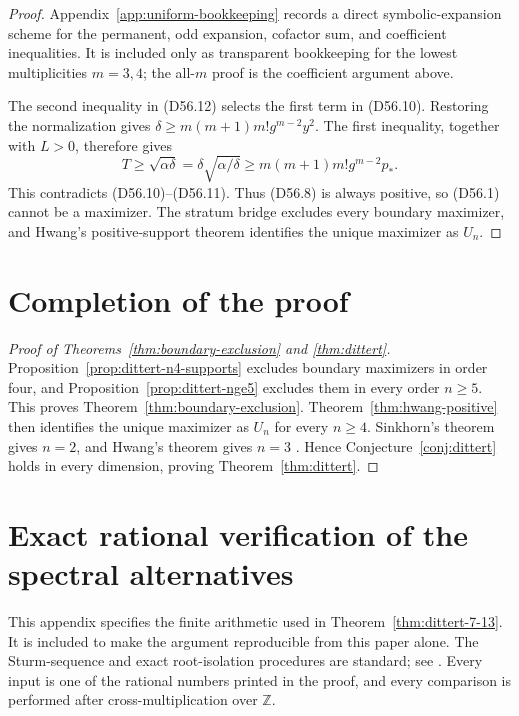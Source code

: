 \documentclass[10pt,a4paper]{amsart}
\theoremstyle{definition}
\theoremstyle{remark}
\begin{document}
\begin{proof}
Appendix~\ref{app:uniform-bookkeeping} records a direct symbolic-expansion
scheme for the permanent, odd expansion, cofactor sum, and coefficient
inequalities.  It is included only as transparent bookkeeping for the
lowest multiplicities \(m=3,4\); the all-\(m\) proof is the coefficient
argument above.

The second inequality in (D56.12) selects the first term in (D56.10).
Restoring the normalization gives
\(\delta\geq m(m+1)m!g^{m-2}y^2\). The first inequality, together with
\(L>0\), therefore gives
\[
T\geq\sqrt{\alpha\delta}
=\delta\sqrt{\alpha/\delta}
\geq m(m+1)m!g^{m-2}p_*.
\]
This contradicts (D56.10)--(D56.11). Thus (D56.8) is always positive, so
(D56.1) cannot be a maximizer. The stratum bridge excludes every boundary
maximizer, and Hwang's positive-support theorem identifies the unique
maximizer as \(U_n\).
\end{proof}

\section{Completion of the proof}\label{sec:completion}

\begin{proof}[Proof of Theorems~\ref{thm:boundary-exclusion} and
\ref{thm:dittert}]
Proposition~\ref{prop:dittert-n4-supports} excludes boundary maximizers in
order four, and Proposition~\ref{prop:dittert-nge5} excludes them in every
order \(n\geq5\).  This proves Theorem~\ref{thm:boundary-exclusion}.
Theorem~\ref{thm:hwang-positive} then identifies the unique maximizer as
\(U_n\) for every \(n\geq4\).  Sinkhorn's theorem gives \(n=2\), and
Hwang's theorem gives \(n=3\) \cite{Sinkhorn,Hwang87}.  Hence
Conjecture~\ref{conj:dittert} holds in every dimension, proving
Theorem~\ref{thm:dittert}.
\end{proof}


\appendix

\section{Exact rational verification of the spectral alternatives}
\label{app:spectral-certificate}

This appendix specifies the finite arithmetic used in
Theorem~\ref{thm:dittert-7-13}.  It is included to make the argument
reproducible from this paper alone.  The Sturm-sequence and exact
root-isolation procedures are standard; see \cite{BasuPollackRoy}.  Every input is one of the rational
numbers printed in the proof, and every comparison is performed after
cross-multiplication over \(\mathbb Z\).
\end{document}
